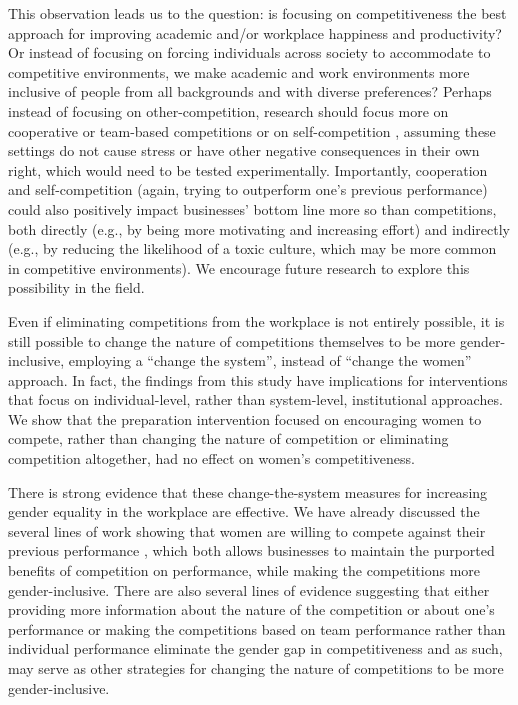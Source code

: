 \documentclass[letterpaper, nobind]{templates/ociamthesis}
\begin{document}
This observation leads us to the question: is focusing on competitiveness the best approach for improving academic and/or workplace happiness and productivity? Or instead of focusing on forcing individuals across society to accommodate to competitive environments, we make academic and work environments more inclusive of people from all backgrounds and with diverse preferences? Perhaps instead of focusing on other-competition, research should focus more on cooperative or team-based competitions \autocite{Gagliarducci2022,Kuhn2015} or on self-competition \autocite{Bonte2018,Carpenter2018,Klinowski2019,Apicella2017a,Apicella2020}, assuming these settings do not cause stress or have other negative consequences in their own right, which would need to be tested experimentally. Importantly, cooperation and self-competition (again, trying to outperform one's previous performance) could also positively impact businesses' bottom line more so than competitions, both directly (e.g., by being more motivating and increasing effort) and indirectly (e.g., by reducing the likelihood of a toxic culture, which may be more common in competitive environments). We encourage future research to explore this possibility in the field.

Even if eliminating competitions from the workplace is not entirely possible, it is still possible to change the nature of competitions themselves to be more gender-inclusive, employing a ``change the system'', instead of ``change the women'' approach. In fact, the findings from this study have implications for interventions that focus on individual-level, rather than system-level, institutional approaches. We show that the preparation intervention focused on encouraging women to compete, rather than changing the nature of competition or eliminating competition altogether, had no effect on women's competitiveness.

There is strong evidence that these change-the-system measures for increasing gender equality in the workplace are effective. We have already discussed the several lines of work showing that women are willing to compete against their previous performance \autocite{Bonte2018,Carpenter2018,Klinowski2019,Apicella2017a,Apicella2020}, which both allows businesses to maintain the purported benefits of competition on performance, while making the competitions more gender-inclusive. There are also several lines of evidence suggesting that either providing more information about the nature of the competition or about one's performance \autocite{Brandts2015,Balafoutas2019,Coffman2021b,Wozniak2014} or making the competitions based on team performance rather than individual performance \autocite{Healy2011,Dargnies2012,Kuhn2015} eliminate the gender gap in competitiveness and as such, may serve as other strategies for changing the nature of competitions to be more gender-inclusive.
\end{document}
